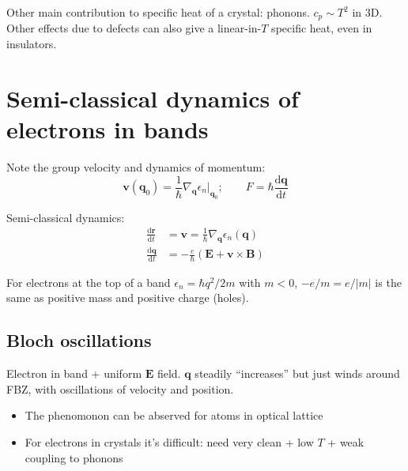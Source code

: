 \documentclass[11pt,letterpaper]{article}
\numberwithin{equation}{section} %
\renewcommand*{\vec}[1]{\bm{#1}}
\newcommand{\dif}{\mathrm d}
\begin{document}
Other main contribution to specific heat of a crystal: phonons. $c_p\sim T^2$
in 3D. Other effects due to defects can also give a linear-in-$T$ specific
heat, even in insulators. 

\section{Semi-classical dynamics of electrons in bands}
\label{sec:semi_classical_dynamics_of_electrons_in_bands}
Note the group velocity and dynamics of momentum: 
\begin{equation}
	\vec v(\vec q_0) = \frac 1\hbar \nabla_{\vec q}\epsilon_n |_{\vec q_0};
	\qquad
	F = \hbar\frac{\dif \vec q}{\dif t}
\end{equation}

Semi-classical dynamics: 
\begin{align}
	\frac{\dif \vec r}{\dif t} &= \vec v = \frac 1\hbar \nabla_{\vec
	q}\epsilon_n(\vec q) \\
	\frac{\dif \vec q}{\dif t} &= -\frac{e}{\hbar} (\vec E + \vec v\times
	\vec B)
\end{align}

For electrons at the top of a band $\epsilon_n = \hbar q^2/2m$ with $m<0$,
$-e/m = e/|m|$ is the same as positive mass and positive charge (holes). 

\subsection{Bloch oscillations}
\label{sub:bloch_oscillations}
Electron in band + uniform $\vec E$ field. $\vec q$ steadily ``increases''
but just winds around FBZ, with oscillations of velocity and position. 
\begin{itemize}
  \item The phenomonon can be abserved for atoms in optical lattice
  \item For electrons in crystals it's difficult: need very clean + low $T$ +
	  weak coupling to phonons
\end{itemize}
\end{document}
